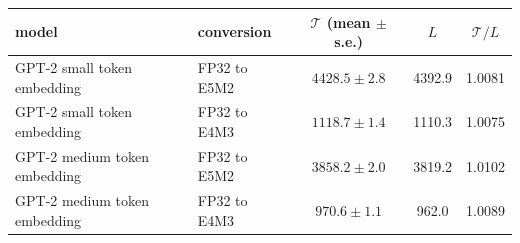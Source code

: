 \begin{tabular}{llccc}
\toprule
model & conversion & $\mathcal{T}$ (mean $\pm$ s.e.) & $L$ & $\mathcal{T}/L$ \\
\midrule
GPT-2 small token embedding & FP32 to E5M2 & $4428.5 \pm 2.8$ & 4392.9 & 1.0081 \\
GPT-2 small token embedding & FP32 to E4M3 & $1118.7 \pm 1.4$ & 1110.3 & 1.0075 \\
GPT-2 medium token embedding & FP32 to E5M2 & $3858.2 \pm 2.0$ & 3819.2 & 1.0102 \\
GPT-2 medium token embedding & FP32 to E4M3 & $970.6 \pm 1.1$ & 962.0 & 1.0089 \\
\bottomrule
\end{tabular}
